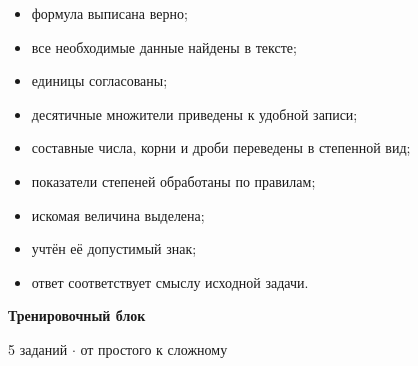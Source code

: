 \documentclass[a4paper,12pt]{article}
\begin{document}
\begin{itemize}
  \item формула выписана верно;
  \item все необходимые данные найдены в тексте;
  \item единицы согласованы;
  \item десятичные множители приведены к удобной записи;
  \item составные числа, корни и дроби переведены в степенной вид;
  \item показатели степеней обработаны по правилам;
  \item искомая величина выделена;
  \item учтён её допустимый знак;
  \item ответ соответствует смыслу исходной задачи.
\end{itemize}

\clearpage

\begin{center}
{\LARGE\bfseries\color{darkaccent}
Тренировочный блок
}

\vspace{2mm}

{\large
5 заданий \(\cdot\) от простого к сложному
}
\end{center}

\vspace{5mm}
\end{document}
